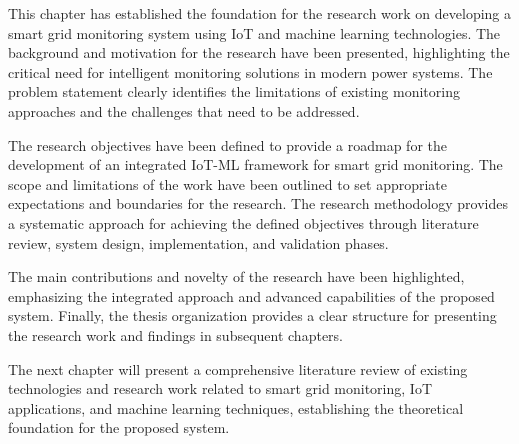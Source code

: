This chapter has established the foundation for the research work on developing a smart grid monitoring system using IoT and machine learning technologies. The background and motivation for the research have been presented, highlighting the critical need for intelligent monitoring solutions in modern power systems. The problem statement clearly identifies the limitations of existing monitoring approaches and the challenges that need to be addressed.

The research objectives have been defined to provide a roadmap for the development of an integrated IoT-ML framework for smart grid monitoring. The scope and limitations of the work have been outlined to set appropriate expectations and boundaries for the research. The research methodology provides a systematic approach for achieving the defined objectives through literature review, system design, implementation, and validation phases.

The main contributions and novelty of the research have been highlighted, emphasizing the integrated approach and advanced capabilities of the proposed system. Finally, the thesis organization provides a clear structure for presenting the research work and findings in subsequent chapters.

The next chapter will present a comprehensive literature review of existing technologies and research work related to smart grid monitoring, IoT applications, and machine learning techniques, establishing the theoretical foundation for the proposed system.